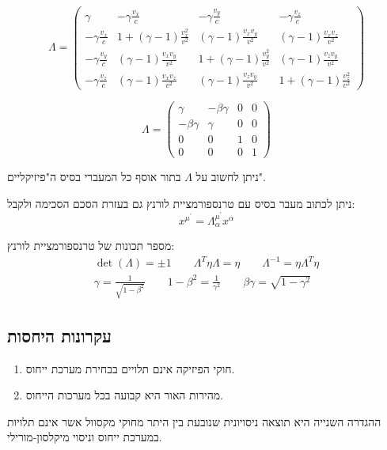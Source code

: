 \documentclass{tstextbook}
\begin{document}
\begin{definition}
$$\Lambda=  \begin{pmatrix}\gamma & -\gamma\frac{v_{x}}{c} & -\gamma\frac{v_{y}}{c} & -\gamma\frac{v_{z}}{c} \\ -\gamma\frac{v_{x}}{c} & 1+(\gamma-1)\frac{v_{x}^2}{v^2} & (\gamma-1)\frac{v_{x}v_{y}}{v^2} & (\gamma-1)\frac{v_{x}v_{z}}{v^2} \\-\gamma\frac{v_{y}}{c} & (\gamma-1)\frac{v_{x}v_{y}}{v^2} & 1+(\gamma-1)\frac{v_{y}^2}{v^2} & (\gamma-1)\frac{v_{z}v_{y}}{v^2} \\-\gamma\frac{v_{z}}{c} & (\gamma-1)\frac{v_{x}v_{z}}{v^2} & (\gamma-1)\frac{v_{z}v_{y}}{v^2} & 1+(\gamma-1)\frac{v_{z}^2}{v^2}
  \end{pmatrix}$$

\end{definition}
\begin{definition}
$$\Lambda=  \begin{pmatrix}\gamma & -\beta\gamma & 0 & 0 \\-\beta\gamma & \gamma & 0 & 0 \\0 & 0 & 1 & 0 \\0 & 0 & 0 & 1  \end{pmatrix}$$

\end{definition}
\begin{remark}
ניתן לחשוב על \(\Lambda\) בתור אוסף כל המעברי בסיס ה"פיזיקליים".

\end{remark}
ניתן לכתוב מעבר בסיס עם טרנספורמציית לורנץ גם בעזרת הסכם הסכימה ולקבל:
$$x^{\mu^{'}}=\Lambda_{\alpha}^{\mu^{'}}x^{\alpha}$$

מספר תכונות של טרנספורמציית לורנץ:
\begin{gather*} \det\left( \Lambda \right)=\pm 1\qquad \Lambda^T\eta \Lambda=\eta \qquad  \Lambda ^{-1}=\eta \Lambda^T \eta\\ \gamma=\frac{1}{\sqrt{ 1-\beta^2 }} \qquad 1-\beta^2=\frac{1}{\gamma^2}  \qquad \beta \gamma = \sqrt{ 1-\gamma^2 } \end{gather*}

\subsection{עקרונות היחסות}

\begin{definition}
  \begin{enumerate}
    \item חוקי הפיזיקה אינם תלויים בבחירת מערכת ייחוס. 


    \item מהירות האור היא קבועה בכל מערכות הייחוס. 


  \end{enumerate}
\end{definition}
ההגדרה השנייה היא תוצאה ניסויונית שנובעת בין היתר מחוקי מקסוול אשר אינם תלויות במערכת ייחוס וניסוי מיקלסון-מורילי.
\end{document}
